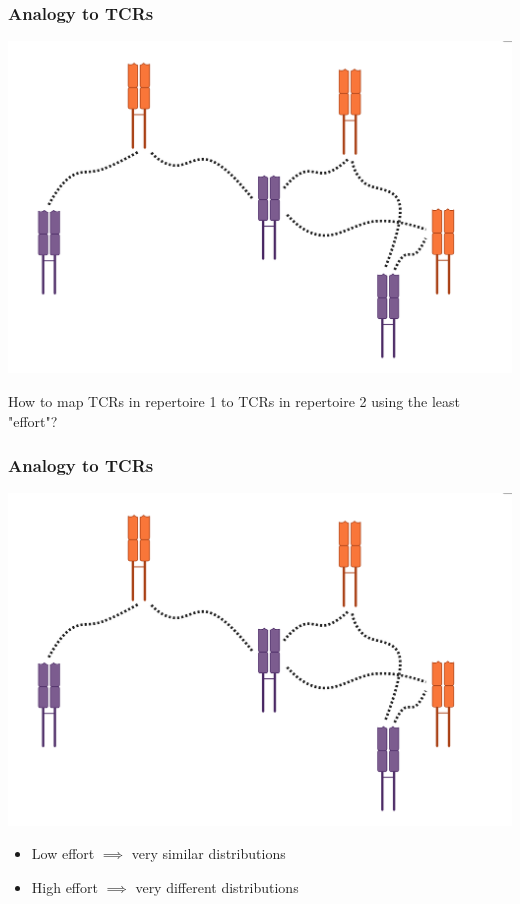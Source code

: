 \documentclass[mathserif,compress,xcolor={dvipsnames}]{beamer}
\renewcommand\;{\,}
\begin{document}
\begin{frame}\frametitle{Analogy to TCRs}
\begin{center}
\includegraphics[width=0.9\linewidth]{Images/TCR_soldier_mapping.png}
\end{center}
How to map TCRs in {\color{Orange} repertoire 1} to TCRs in {\color{Purple} repertoire 2} using the least "effort"?
\end{frame}

\begin{frame}\frametitle{Analogy to TCRs}
\begin{center}
\includegraphics[width=0.9\linewidth]{Images/TCR_soldier_mapping.png}
\begin{itemize}
\item[]
Low effort $\implies$ very similar distributions 
\item[]
High effort $\implies$ very different distributions 
\end{itemize}
\end{center}
\end{frame}
\end{document}
